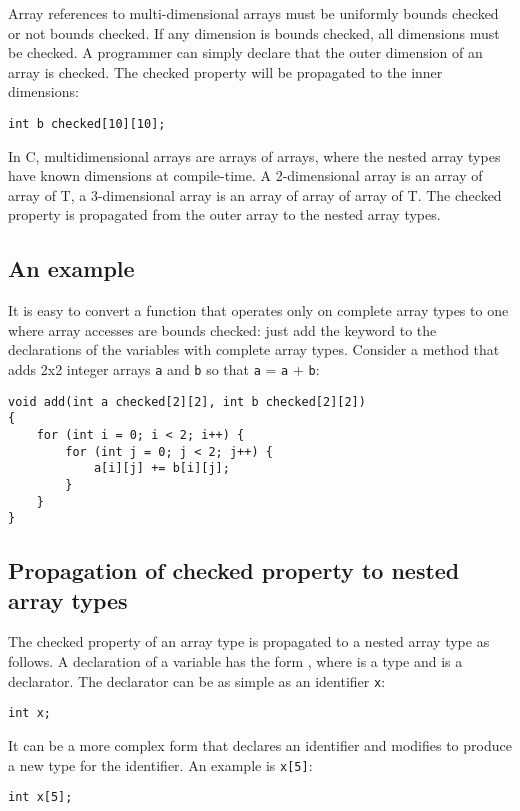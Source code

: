 Array references to multi-dimensional arrays must be uniformly bounds
checked or not bounds checked. If any dimension is bounds checked, all
dimensions must be checked. A programmer can simply declare that
the outer dimension of an array is checked.  The checked property will be 
propagated to the inner dimensions:

\begin{verbatim}
int b checked[10][10];
\end{verbatim}

In C, multidimensional arrays are arrays of arrays,
where the nested array types have known dimensions at compile-time. A
2-dimensional array is an array of array of T, a 3-dimensional array is
an array of array of array of T. The checked property is propagated from the
outer array to the nested array types.

\subsection{An example}

It is easy to convert a function that operates only on complete array
types to one where array accesses are bounds checked: just add the
 keyword to the declarations of the variables with complete array
types. Consider a method that adds 2x2 integer arrays \texttt{a} and
\texttt{b} so that \texttt{a} = \texttt{a} + \texttt{b}:

\begin{verbatim}
void add(int a checked[2][2], int b checked[2][2])
{
    for (int i = 0; i < 2; i++) {
        for (int j = 0; j < 2; j++) {
            a[i][j] += b[i][j];
        }
    }
}
\end{verbatim}

\subsection{Propagation of checked property to nested array types}
The checked property of an array type is propagated to a nested array type as follows.
A declaration of a variable has the form  ,
where  is a type and  is a declarator. The declarator
can be as simple as an identifier \texttt{x}:
\begin{verbatim}
int x;
\end{verbatim}
It can be a more complex form that declares an identifier and modifies 
to produce a new type for the identifier. An example is \texttt{x[5]}:
\begin{verbatim}
int x[5];
\end{verbatim}

